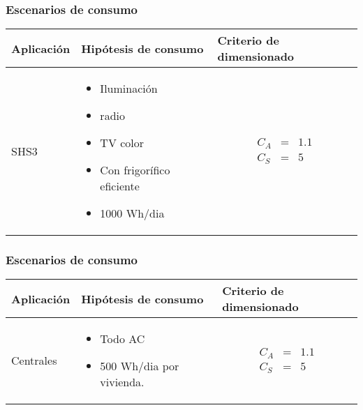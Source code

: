 \documentclass[serif, xcolor=dvipsnames]{beamer}
\begin{document}
\begin{frame}
\frametitle{Escenarios de consumo}

\begin{tabular}{>{\centering}p{2cm}>{\centering}p{4cm}>{\centering}p{2cm}}
\toprule 
Aplicación & Hipótesis de consumo & Criterio de dimensionado\tabularnewline
\midrule
\midrule 
SHS3 & \begin{itemize}
\item Iluminación
\item radio
\item TV color
\item Con frigorífico eficiente
\item 1000 Wh/dia
\end{itemize}
 & \begin{eqnarray*}
C_{A} & = & 1.1\\
C_{S} & = & 5\end{eqnarray*}
\tabularnewline
\bottomrule
\end{tabular}


\end{frame}

\begin{frame}
\frametitle{Escenarios de consumo}

\begin{tabular}{>{\centering}p{2cm}>{\centering}p{4cm}>{\centering}p{2cm}}
\toprule 
Aplicación & Hipótesis de consumo & Criterio de dimensionado\tabularnewline
\midrule
\midrule 
Centrales & \begin{itemize}
\item Todo AC 
\item 500 Wh/dia por vivienda. 
\end{itemize}
 & \begin{eqnarray*}
C_{A} & = & 1.1\\
C_{S} & = & 5\end{eqnarray*}
\tabularnewline
\bottomrule
\end{tabular}


\end{frame}
\end{document}

